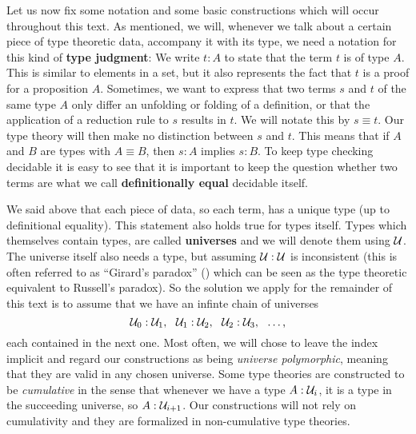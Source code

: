 Let us now fix some notation and some basic constructions which will occur
throughout this text.
As mentioned, we will, whenever we talk about a certain piece of type theoretic
data, accompany it with its type,
we need a notation for this kind of \textbf{type judgment}:
We write $t : A$ to state that the term $t$ is of type $A$.
This is similar to elements in a set, but it also represents the fact
that $t$ is a proof for a proposition $A$.
Sometimes, we want to express that two terms $s$ and $t$ of the same type $A$
only differ an unfolding or folding of a definition, or that the application of
a reduction rule to $s$ results in $t$.
We will notate this by $s \equiv t$.
Our type theory will then make no distinction between $s$ and $t$.
This means that if $A$ and $B$ are types with $A \equiv B$, then
$s : A$ implies $s : B$.
To keep type checking decidable it is easy to see that it is important
to keep the question whether two terms are what we call \textbf{definitionally equal}
decidable itself.

We said above that each piece of data, so each term,
has a unique type (up to definitional equality).
This statement also holds true for types itself.
Types which themselves contain types, are called \textbf{universes} and we will
denote them using $\mathcal{U}$.
The universe itself also needs a type, but
assuming $\mathcal{U} : \mathcal{U}$ is inconsistent (this is often referred to as
``Girard's paradox'' (\cite{girard72,hurkens95}) which can be seen as the type theoretic equivalent
to Russell's paradox).
So the solution we apply for the remainder of this text is
to assume that we have an infinte chain of universes
\begin{equation*}
\mathcal{U}_0 : \mathcal{U}_1,~~ \mathcal{U}_1 : \mathcal{U}_2,~~ \mathcal{U}_2 : \mathcal{U}_3,~~ \ldots \text{,}
\end{equation*}
each contained in the next one.
Most often, we will chose to leave the index implicit and regard our constructions
as being \emph{universe polymorphic}, meaning that they are valid in any chosen
universe.
Some type theories are constructed to be \emph{cumulative} in the sense that whenever
we have a type $A : \mathcal{U}_i$, it is a type in the succeeding universe, so $A : \mathcal{U}_{i+1}$.
Our constructions will not rely on cumulativity and they are formalized in
non-cumulative type theories.

